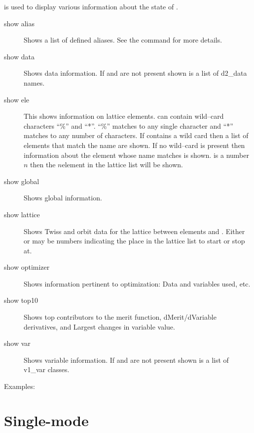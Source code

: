 \vskip 0.2in
 is used to display various information about the state of \tao.
\begin{description}
\item[show alias]
Shows a list of defined aliases. See the  command for more
details.
\item[show data]
Shows data information. If  and  are not
present shown is a list of d2\_data names.
\item[show ele]
This shows information on lattice elements.  can
contain wild--card characters ``\%'' and ``*''. ``\%'' matches to any
single character and ``*'' matches to any number of characters. If
 contains a wild card then a list of elements that
match the name are shown. If no wild--card is present then information
about the element whose name matches  is
shown.  is a number $n$ then the $n$\Th element in the
lattice list will be shown.
\item[show global]
Shows global information.
\item[show lattice]
Shows Twiss and orbit data for the  lattice between elements
 and . Either  or
 may be numbers indicating the place in the lattice
list to start or stop at.
\item[show optimizer]
Shows information pertinent to optimization: Data and variables used, etc.
\item[show top10]
Shows top contributors to the merit function, dMerit/dVariable
derivatives, and Largest changes in variable value.
\item[show var]
Shows variable information. If  and  are
not present shown is a list of v1\_var classes.
\end{description}

Examples:

\section{Single-mode}
\label{s:sing}

